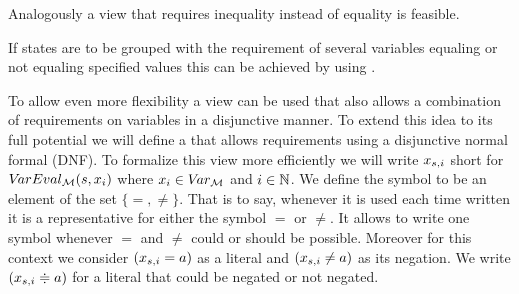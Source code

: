 \documentclass[preview]{standalone}
\begin{document}
Analogously a view that requires inequality instead of equality is feasible.


If states are to be grouped with the requirement of several variables equaling or not equaling specified values this can be achieved by using \parllcompN.

To allow even more flexibility a view can be used that also allows a combination of requirements on variables in a disjunctive manner. To extend this idea to its full potential we will define a \viewN that allows requirements using a disjunctive normal formal (DNF). To formalize this view more efficiently we will write $\varstate[,i]$ short for $\vareval(\state, \var_i)$ where $x_i \in \vars$ and $i \in \natnums$. We define the symbol \eqorneq to be an element of the set $\{=,\neq\}$. That is to say, whenever it is used each time written it is a representative for either the symbol $=$ or $\neq$. It allows to write one symbol whenever $=$ and $\neq$ could or should be possible. Moreover for this context we consider $(\varstate[,i] = \varval)$ as a literal and $(\varstate[,i] \neq \varval)$ as its negation. We write $(\varstate[,i] \eqorneq \varval)$ for a literal that could be negated or not negated.
\end{document}
